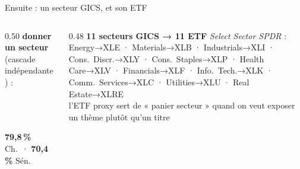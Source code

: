 \documentclass[11pt,aspectratio=169]{beamer}
\newcommand{\co}[1]{\texttt{#1}}
\newcommand{\badge}[2]{\colorbox{#1}{\textcolor{white}{\footnotesize\textbf{#2}}}}
\begin{document}
\begin{frame}{Ensuite : un secteur GICS, et son ETF}
  \begin{columns}[c]
    \begin{column}{0.50\textwidth}\footnotesize
      \textbf{donner un secteur} (cascade indépendante) :\\[1.5mm]
      \\[2.5mm]
      \badge{dataC}{secteur renseigné}\quad
      {\footnotesize \textbf{79,8\,\%} Ch.\ · \textbf{70,4\,\%} Sén.}
    \end{column}
    \begin{column}{0.48\textwidth}\footnotesize
      \textbf{11 secteurs GICS → 11 ETF} \emph{Select Sector SPDR} :\\[1.5mm]
      {\scriptsize\ttfamily
      Energy→XLE · Materials→XLB · Industrials→XLI · Cons.\ Discr.→XLY ·
      Cons.\ Staples→XLP · Health Care→XLV · Financials→XLF · Info.\ Tech.→XLK ·
      Comm.\ Services→XLC · Utilities→XLU · Real Estate→XLRE}\\[3mm]
      {\scriptsize\color{black!60} l'ETF proxy sert de « panier secteur » quand on
       veut exposer un thème plutôt qu'un titre}
    \end{column}
  \end{columns}
\end{frame}
\end{document}
